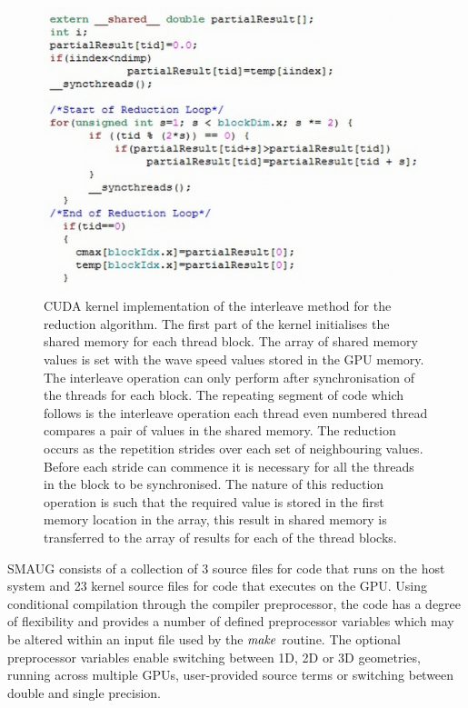 \begin{figure}[h]
\includegraphics[scale=0.75]{reduction_parallel_fig5.jpg}
\caption{CUDA kernel implementation of the interleave method for the reduction algorithm. The first part of the kernel initialises the shared memory for each thread block. The array of shared memory values is set with the wave speed values stored in the GPU memory. The interleave operation can only perform after synchronisation of the threads for each block. The repeating segment of code which follows is the interleave operation each thread even numbered thread compares a pair of values in the shared memory. The reduction occurs as the repetition strides over each set of neighbouring values. Before each stride can commence it is necessary for all the threads in the block to be synchronised. The nature of this reduction operation is such that the required value is stored in the first memory location in the array, this result in shared memory is transferred to the array of results for each of the thread blocks. }
\end{figure}






SMAUG consists of a collection of  3 source files for code that runs on the host system and 23 kernel source files for code that executes on the GPU. Using conditional compilation through the compiler preprocessor, the code has a degree of flexibility and provides a number of defined preprocessor variables which may be altered within an input file used by the $\it{make}$ routine. The optional preprocessor variables enable switching between 1D, 2D or 3D geometries, running across multiple GPUs, user-provided source terms or switching between double and single precision.





